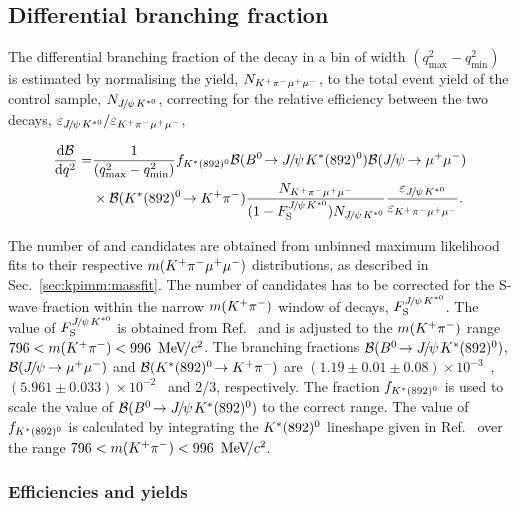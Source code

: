 \subsection{Differential branching fraction}
\label{sec:kpimm:bf}
 
The differential branching fraction of the decay \BdToKpimm in a \qsq bin of width $(q^{2}_{\text{max}} - q^{2}_{\text{min}})$ is estimated by normalising the \BdToKpimm yield, $N_{{{K}^+}{{\pi}^-}{\mu^+}{\mu^-}}$, to the total event yield of the \BdToJPsiKst control sample, $N_{{{J\mskip -3mu/\mskip -2mu\psi\mskip 2mu}}{{K}^{*0}}}$, correcting for the relative efficiency between the two decays, $\varepsilon_{{{J\mskip -3mu/\mskip -2mu\psi\mskip 2mu}}{{K}^{*0}}}/\varepsilon_{{{K}^+}{{\pi}^-}{\mu^+}{\mu^-}}$,
 
\begin{equation}
\begin{split}
\frac{\deriv\BF}{\deriv\qsq} = &\frac{1}{(q^{2}_{\text{max}} - q^{2}_{\text{min}}) }f_{\KstP}\BF(\BdToJPsiKstP)\BF(\decay{\jpsi}{\mumu}) \\
&\times\BF(\decay{\KstP}{\Kp\pim})\frac{N_{\kpimm}}{(1-F_{\rm S}^{\jpsi\Kstarz})N_{\jpsi\Kstarz}} \frac{\varepsilon_{\jpsi\Kstarz}}{\varepsilon_{\kpimm}}.
\end{split}
\label{eqn:dbfdq2}
\end{equation}
 
\noindent The number of \BdToJPsiKst and \BdToKpimm candidates are obtained from unbinned maximum likelihood fits to their respective $m({{K}^+}{{\pi}^-}{\mu^+}{\mu^-})$ distributions, as described in Sec.~\ref{sec:kpimm:massfit}. The number of \BdToJPsiKst candidates has to be corrected for the S-wave fraction within the narrow $m({{K}^+}{{\pi}^-})$ window of \BdToJPsiKst decays, $F_{\rm S}^{{{J\mskip -3mu/\mskip -2mu\psi\mskip 2mu}}{{K}^{*0}}}$. The value of $F_{\rm S}^{{{J\mskip -3mu/\mskip -2mu\psi\mskip 2mu}}{{K}^{*0}}}$ is obtained from Ref.~\cite{LHCb-JpsiKstar} and is adjusted to the $m({{K}^+}{{\pi}^-})$ range $796<m({{K}^+}{{\pi}^-})<996~{\mathrm{\,Me\kern -0.1em V\!/}c^2}$. The branching fractions ${\mathcal{B}}({{B}^0}\!\rightarrow {\ensuremath{{J\mskip -3mu/\mskip -2mu\psi\mskip 2mu}}}{\ensuremath{K}}^{*}(892)^{0})$, ${\mathcal{B}}({{J\mskip -3mu/\mskip -2mu\psi\mskip 2mu}}\!\rightarrow {\ensuremath{\mu^+\mu^-}})$ and ${\mathcal{B}}({K}^{*}(892)^{0}\!\rightarrow {\ensuremath{{K}^+}}{\ensuremath{{\pi}^-}})$ are $(1.19\pm0.01\pm0.08)\times10^{-3}$~\cite{belle-z-paper}, $(5.961 \pm 0.033) \times 10^{-2}$~\cite{pdg} and 2/3, respectively. The fraction $f_{{K}^{*}(892)^{0}}$ is used to scale the value of ${\mathcal{B}}({{B}^0}\!\rightarrow {\ensuremath{{J\mskip -3mu/\mskip -2mu\psi\mskip 2mu}}}{\ensuremath{K}}^{*}(892)^{0})$ to the correct \mkpi range.  The value of $f_{{K}^{*}(892)^{0}}$ is calculated by integrating the ${K}^{*}(892)^{0}$ lineshape given in Ref.~\cite{belle-z-paper} over the range $796<m({{K}^+}{{\pi}^-})<996~{\mathrm{\,Me\kern -0.1em V\!/}c^2}$.
 
\subsubsection{Efficiencies and yields}

